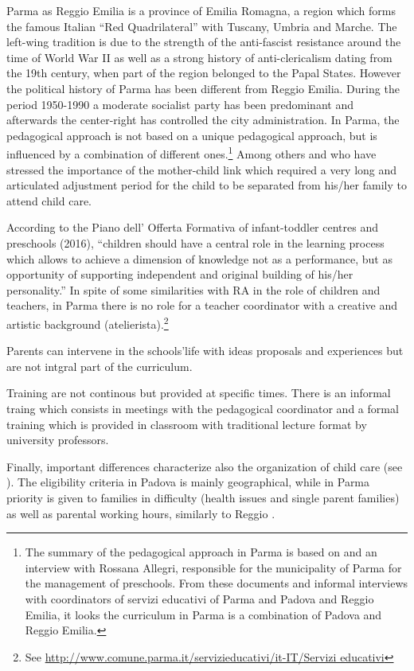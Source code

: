 \documentclass[12pt]{article}
\begin{document}
Parma as Reggio Emilia is a province of Emilia Romagna, a region which forms
the famous Italian ``Red Quadrilateral'' with Tuscany, Umbria and Marche.
The left-wing tradition is due to the strength of the anti-fascist
resistance around the time of World War II as well as a strong history of
anti-clericalism dating from the 19th century, when part of the region
belonged to the Papal States. However the political history of Parma has
been different from Reggio Emilia. During the period 1950-1990 a moderate
socialist party has been predominant and afterwards the center-right has
controlled the city administration. In Parma, the pedagogical approach is
not based on a unique pedagogical approach, but is influenced by a
combination of different ones.\footnote{%
The summary of the pedagogical approach in Parma is based on \cite{Parma2006}
and an interview with Rossana Allegri, responsible for the municipality of
Parma for the management of preschools. From these documents and informal
interviews with coordinators of servizi educativi of Parma and Padova and
Reggio Emilia, it looks the curriculum in Parma is a combination of Padova
and Reggio Emilia.} Among others \cite{Winnicott1965} and \cite{Bion1962}
who have stressed the importance of the mother-child link which required a
very long and articulated adjustment period for the child to be separated
from his/her family to attend child care.

According to the Piano dell' Offerta Formativa of infant-toddler centres and
preschools (2016), ``children should have a central role in the learning
process which allows to achieve a dimension of knowledge not as a
performance, but as opportunity of supporting independent and original
building of his/her personality.'' In spite of some similarities with RA in
the role of children and teachers, in Parma there is no role for a teacher
coordinator with a creative and artistic background (atelierista).\footnote{%
See \url{http://www.comune.parma.it/servizieducativi/it-IT/Servizi educativi}%
}

Parents can intervene in the schools'life with ideas proposals and
experiences but are not intgral part of the curriculum.

Training are not continous but provided at specific times. There is an
informal traing which consists in meetings with the pedagogical coordinator
and a formal training which is provided in classroom with traditional
lecture format by university professors.

Finally, important differences characterize also the organization of child
care (see \cite{DelBoca2016}). The eligibility criteria in Padova is mainly
geographical, while in Parma priority is given to families in difficulty
(health issues and single parent families) as well as parental working
hours, similarly to Reggio \citep{Frabboni1999}.
\end{document}

